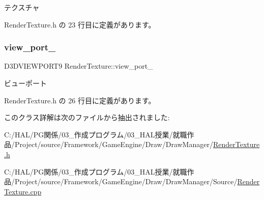 テクスチャ 



 Render\+Texture.\+h の 23 行目に定義があります。

\mbox{\label{class_render_texture_a40f181cab9d298d58868929d6cf28cd8}} 
\subsubsection{\texorpdfstring{view\+\_\+port\+\_\+}{view\_port\_}}
{\footnotesize\ttfamily D3\+D\+V\+I\+E\+W\+P\+O\+R\+T9 Render\+Texture\+::view\+\_\+port\+\_\+\hspace{0.3cm}{\ttfamily [private]}}



ビューポート 



 Render\+Texture.\+h の 26 行目に定義があります。



このクラス詳解は次のファイルから抽出されました\+:\begin{DoxyCompactItemize}
\item 
C\+:/\+H\+A\+L/\+P\+G関係/03\+\_\+作成プログラム/03\+\_\+\+H\+A\+L授業/就職作品/\+Project/source/\+Framework/\+Game\+Engine/\+Draw/\+Draw\+Manager/\mbox{\hyperlink{_render_texture_8h}{Render\+Texture.\+h}}\item 
C\+:/\+H\+A\+L/\+P\+G関係/03\+\_\+作成プログラム/03\+\_\+\+H\+A\+L授業/就職作品/\+Project/source/\+Framework/\+Game\+Engine/\+Draw/\+Draw\+Manager/\+Source/\mbox{\hyperlink{_render_texture_8cpp}{Render\+Texture.\+cpp}}\end{DoxyCompactItemize}
